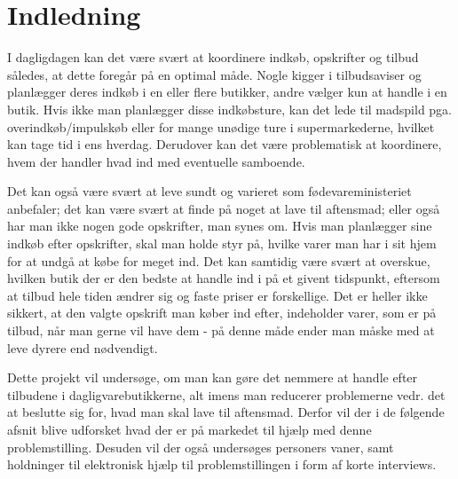 \chapter{Indledning}\label{chapter:indledning}

I dagligdagen kan det være svært at koordinere indkøb, opskrifter og tilbud således, at dette foregår på en optimal måde. Nogle kigger i tilbudsaviser og planlægger deres indkøb i en eller flere butikker, andre vælger kun at handle i en butik. Hvis ikke man planlægger disse indkøbsture, kan det lede til madspild pga. overindkøb/impulskøb eller for mange unødige ture i supermarkederne, hvilket kan tage tid i ens hverdag. Derudover kan det være problematisk at koordinere, hvem der handler hvad ind med eventuelle samboende.

Det kan også være svært at leve sundt og varieret som fødevareministeriet anbefaler; det kan være svært at finde på noget at lave til aftensmad; eller også har man ikke nogen gode opskrifter, man synes om.
Hvis man planlægger sine indkøb efter opskrifter, skal man holde styr på, hvilke varer man har i sit hjem for at undgå at købe for meget ind. Det kan samtidig være svært at overskue, hvilken butik der er den bedste at handle ind i på et givent tidspunkt, eftersom at tilbud hele tiden ændrer sig og faste priser er forskellige. Det er heller ikke sikkert, at den valgte opskrift man køber ind efter, indeholder varer, som er på tilbud, når man gerne vil have dem - på denne måde ender man måske med at leve dyrere end nødvendigt.

Dette projekt vil undersøge, om man kan gøre det nemmere at handle efter tilbudene i dagligvarebutikkerne, alt imens man reducerer problemerne vedr. det at beslutte sig for, hvad man skal lave til aftensmad.
Derfor vil der i de følgende afsnit blive udforsket hvad der er på markedet til hjælp med denne problemstilling. Desuden vil der også undersøges personers vaner, samt holdninger til elektronisk hjælp til problemstillingen i form af korte interviews.
